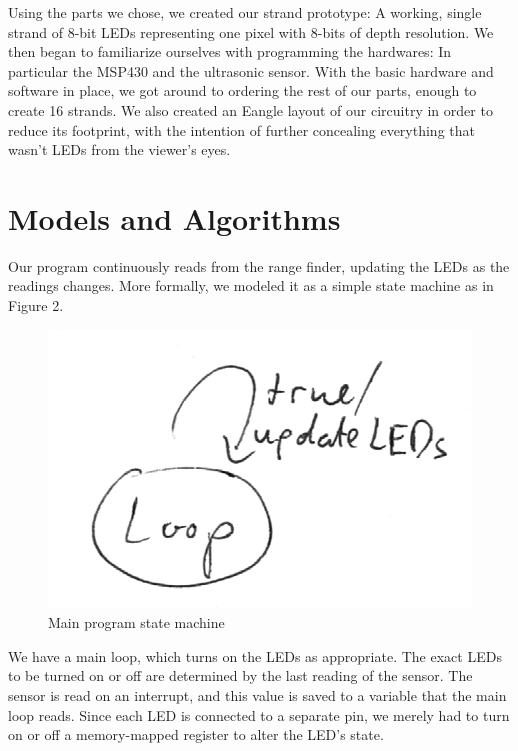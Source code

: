 \documentclass[10pt,titlepage]{article}
\begin{document}
  Using the parts we chose, we created our strand prototype: A working, single strand of 8-bit LEDs representing one pixel with 8-bits of depth resolution. We then began to familiarize ourselves with programming the hardwares: In particular the MSP430 and the ultrasonic sensor. With the basic hardware and software in place, we got around to ordering the rest of our parts, enough to create 16 strands. We also created an Eangle layout of our circuitry in order to reduce its footprint, with the intention of further concealing everything that wasn't LEDs from the viewer's eyes. \\

  \section*{Models and Algorithms}
  Our program continuously reads from the range finder, updating the LEDs as the readings changes. More formally, we modeled it as a simple state machine as in Figure 2. \\
  \begin{figure}[h!]
      \centering
      \includegraphics[scale=0.75]{1.png}
      \caption{Main program state machine}
  \end{figure}

  We have a main loop, which turns on the LEDs as appropriate. The exact LEDs to be turned on or off are determined by the last reading of the sensor. The sensor is read on an interrupt, and this value is saved to a variable that the main loop reads. Since each LED is connected to a separate pin, we merely had to turn on or off a memory-mapped register to alter the LED's state. \\
\end{document}
